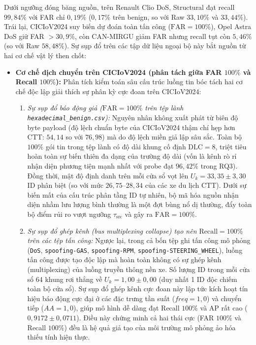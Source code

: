 \documentclass[12pt, a4paper, reqno, oneside]{book}
\DeclareRobustCommand{\code}[1]{\nolinkurl{#1}}
\begin{document}
Dưới ngưỡng đóng băng nguồn, trên Renault Clio DoS, Structural đạt recall $99{,}84\%$ với FAR chỉ $0{,}19\%$ ($0{,}17\%$ trên benign, so với Raw $33{,}10\%$ và $33{,}44\%$). Trái lại, CICIoV2024 suy biến dự đoán toàn tấn công ($\text{FAR}=100\%$), Opel Astra DoS giữ FAR $>30{,}9\%$, còn CAN-MIRGU giảm FAR nhưng recall tụt còn $5{,}46\%$ (so với Raw $58{,}48\%$). Sự sụp đổ trên các tập dữ liệu ngoại bộ này bắt nguồn từ hai cơ chế vật lý then chốt:
\begin{itemize}
    \item \textbf{Cơ chế dịch chuyển trên CICIoV2024 (phân tách giữa FAR $100\%$ và Recall $100\%$):} Phân tích kiểm toán sâu cấu trúc luồng tin bóc tách hai cơ chế độc lập giải thích sự phân kỳ cực đoan trên CICIoV2024:
    \begin{enumerate}
        \item \textit{Sự sụp đổ báo động giả ($\text{FAR}=100\%$ trên tệp lành \code{hexadecimal_benign.csv}):} Nguyên nhân không xuất phát từ biên độ byte payload (độ lệch chuẩn byte của CICIoV2024 thậm chí hẹp hơn CTT: $54{,}14$ so với $76{,}98$) mà do độ lệch miền giả lập sâu sắc. Toàn bộ $100\%$ gói tin trong tệp lành có độ dài khung cố định $\text{DLC} = 8$, triệt tiêu hoàn toàn sự biến thiên đa dạng của trường độ dài (vốn là kênh rò rỉ nhận diện phương tiện mạnh nhất với probe đạt $96{,}42\%$ trong RQ3). Đồng thời, mật độ định danh trên mỗi cửa sổ vọt lên $U_k = 33{,}35 \pm 3{,}30$ ID phân biệt (so với mức $26{,}75\text{--}28{,}34$ của các xe du lịch CTT). Dưới sự biến mất của cấu trúc phân tầng ID tự nhiên, bộ mã hóa nguồn nhận diện nhầm lưu lượng bình thường là một đợt bùng nổ dị thường, đẩy toàn bộ điểm rủi ro vượt ngưỡng $\tau_{\text{src}}$ và gây ra $\text{FAR} = 100\%$.
        \item \textit{Sự sụp đổ ghép kênh (bus multiplexing collapse) tạo nên $\text{Recall}=100\%$ trên các tệp tấn công:} Ngược lại, trong cả bốn tệp ghi tấn công mô phỏng (\code{DoS}, \code{spoofing-GAS}, \code{spoofing-RPM}, \code{spoofing-STEERING_WHEEL}), luồng tấn công được tạo độc lập mà hoàn toàn không có sự ghép kênh (multiplexing) của luồng truyền thông nền xe. Số lượng ID trong mỗi cửa sổ 64 khung rơi thẳng về $U_k = 1{,}00 \pm 0{,}00$ (duy nhất 1 ID độc chiếm toàn bộ cửa sổ). Sự sụp đổ ghép kênh cực đoan này lập tức kích hoạt tín hiệu báo động cực đại ở các đặc trưng tần suất ($freq=1{,}0$) và chuyển tiếp ($AA=1{,}0$), giúp mô hình dễ dàng đạt Recall $100\%$ và AP rất cao ($0{,}9172 \pm 0{,}0711$). Điều này chứng minh cả hai thái cực (FAR $100\%$ và Recall $100\%$) đều là hệ quả giả tạo của môi trường mô phỏng ảo hóa thiếu tính hiện thực.

\end{enumerate}
\end{itemize}
\end{document}

